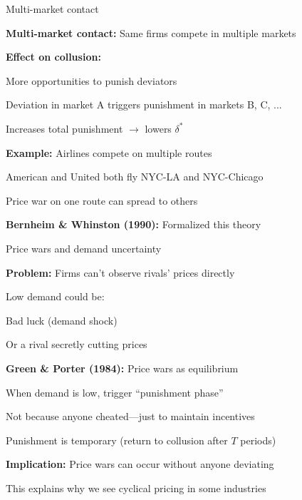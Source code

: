 \documentclass[notes,11pt, aspectratio=169]{beamer}
\newenvironment{wideitemize}{\itemize\addtolength{\itemsep}{10pt}}{\enditemize}
\begin{document}
\begin{frame}{Multi-market contact}
	\begin{wideitemize}
		\item \textbf{Multi-market contact:} Same firms compete in multiple markets
		\item \textbf{Effect on collusion:}
		\begin{wideitemize}
			\vspace{5pt}
			\item More opportunities to punish deviators
			\item Deviation in market A triggers punishment in markets B, C, ...
			\item Increases total punishment $\rightarrow$ lowers $\delta^*$
		\end{wideitemize}
		\item \textbf{Example:} Airlines compete on multiple routes
		\begin{wideitemize}
			\vspace{5pt}
			\item American and United both fly NYC-LA and NYC-Chicago
			\item Price war on one route can spread to others
		\end{wideitemize}
		\item \textbf{Bernheim \& Whinston (1990):} Formalized this theory
	\end{wideitemize}
\end{frame}

\begin{frame}{Price wars and demand uncertainty}
	\begin{wideitemize}
		\item \textbf{Problem:} Firms can't observe rivals' prices directly
		\item Low demand could be:
		\begin{wideitemize}
			\vspace{5pt}
			\item Bad luck (demand shock)
			\item Or a rival secretly cutting prices
		\end{wideitemize}
		\item \textbf{Green \& Porter (1984):} Price wars as equilibrium
		\begin{wideitemize}
			\vspace{5pt}
			\item When demand is low, trigger ``punishment phase''
			\item Not because anyone cheated---just to maintain incentives
			\item Punishment is temporary (return to collusion after $T$ periods)
		\end{wideitemize}
		\item \textbf{Implication:} Price wars can occur without anyone deviating
		\item This explains why we see cyclical pricing in some industries
	\end{wideitemize}
\end{frame}
\end{document}
